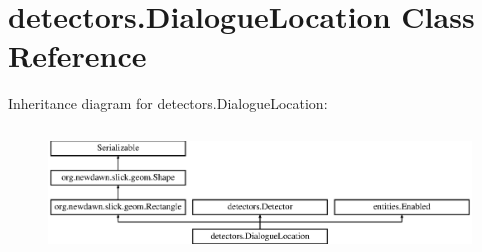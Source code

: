 \hypertarget{classdetectors_1_1_dialogue_location}{}\section{detectors.\+Dialogue\+Location Class Reference}
\label{classdetectors_1_1_dialogue_location}
Inheritance diagram for detectors.\+Dialogue\+Location\+:\begin{figure}[H]
\begin{center}
\leavevmode
\includegraphics[height=3.409437cm]{classdetectors_1_1_dialogue_location}
\end{center}
\end{figure}
